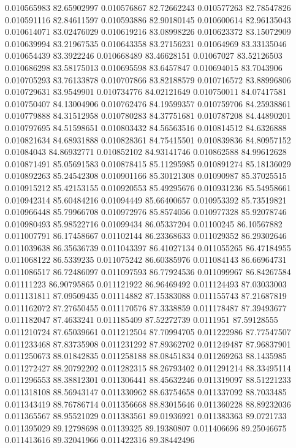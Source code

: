 0.010565983	82.65902997
0.010576867	82.72662243
0.010577263	82.78547826
0.010591116	82.84611597
0.010593886	82.90180145
0.010600614	82.96135043
0.010614071	83.02476029
0.010619216	83.08998226
0.010623372	83.15072909
0.010639994	83.21967535
0.010643358	83.27156231
0.01064969	83.33135046
0.010654439	83.3922246
0.010668489	83.46628151
0.01067027	83.52126503
0.010686298	83.58175013
0.010695598	83.6457847
0.010694015	83.7043906
0.010705293	83.76133878
0.010707866	83.82188579
0.010716572	83.88996806
0.010729631	83.9549901
0.010734776	84.02121649
0.010750011	84.07417581
0.010750407	84.13004906
0.010762476	84.19599357
0.010759706	84.25938861
0.010779888	84.31512958
0.010780283	84.37751681
0.010787208	84.44890201
0.010797695	84.51598651
0.010803432	84.56563516
0.010814512	84.6326888
0.010821634	84.68931888
0.010828361	84.75415501
0.010839836	84.80957152
0.01084043	84.86932771
0.010852102	84.93141746
0.010862588	84.99612628
0.010871491	85.05691583
0.010878415	85.11295985
0.010891274	85.18136029
0.010892263	85.24542308
0.010901166	85.30121308
0.01090987	85.37025515
0.010915212	85.42153155
0.010920553	85.49295676
0.010931236	85.54958661
0.010942314	85.60484216
0.01094449	85.66400657
0.010953392	85.73519821
0.010966448	85.79966708
0.010972976	85.8574056
0.010977328	85.92078746
0.010980493	85.98522716
0.01099434	86.05337204
0.01100245	86.10567882
0.011007791	86.17458667
0.01102144	86.23368633
0.011029352	86.29302646
0.011039638	86.35636739
0.011043397	86.41027134
0.011055265	86.47184955
0.011068122	86.5339235
0.011075242	86.60385976
0.011084143	86.66964731
0.011086517	86.72486097
0.011097593	86.77924536
0.011099967	86.84267584
0.01111223	86.90795865
0.011121922	86.96469492
0.011124493	87.03033003
0.011131811	87.09509435
0.01114882	87.15383088
0.011155743	87.21687819
0.011162072	87.27650455
0.011170576	87.3338859
0.011178487	87.39493677
0.011182047	87.4633241
0.011185409	87.52272739
0.0111951	87.59128555
0.011210724	87.65039661
0.011212504	87.70994705
0.011222986	87.77547507
0.011233468	87.83735908
0.011231292	87.89362702
0.011249487	87.96837901
0.011250673	88.01842835
0.011258188	88.08451834
0.011269263	88.1435985
0.011272427	88.20792202
0.011282315	88.26793402
0.011291214	88.33495114
0.011296553	88.38812301
0.011306441	88.45632246
0.011319097	88.51221233
0.011318108	88.56943147
0.011330962	88.63754658
0.011337092	88.7033485
0.011343419	88.76786714
0.011356668	88.83015646
0.011360228	88.89232036
0.011365567	88.95521029
0.011383561	89.01936921
0.011383363	89.0721733
0.011395029	89.12798698
0.01139325	89.19380807
0.011406696	89.25046675
0.011413616	89.32041966
0.011422316	89.38442496
